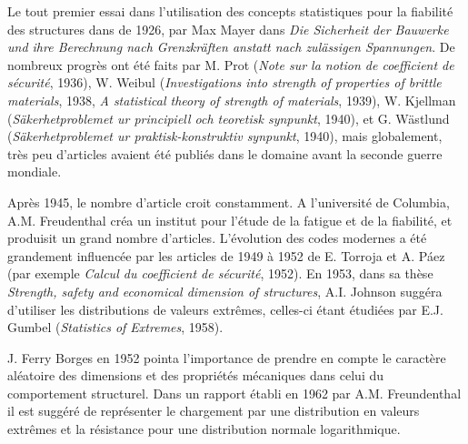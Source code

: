 \begin{histoire}
Le tout premier essai dans l'utilisation des concepts statistiques pour la fiabilité des structures dans de 1926, par Max Mayer dans \emph{Die Sicherheit der Bauwerke und ihre Berechnung nach Grenzkräften anstatt nach zulässigen Spannungen}. De nombreux progrès ont été faits par M. Prot (\emph{Note sur la notion de coefficient de sécurité}, 1936), W. Weibul (\emph{Investigations into strength of properties of brittle materials}, 1938, \emph{A statistical theory of strength of materials}, 1939), W. Kjellman (\emph{Säkerhetproblemet ur principiell och teoretisk synpunkt}, 1940), et G. Wästlund (\emph{Säkerhetproblemet ur praktisk-konstruktiv synpunkt}, 1940), mais globalement, très peu d'articles avaient été publiés dans le domaine avant la seconde guerre mondiale.

Après 1945, le nombre d'article croit constamment. A l'université de Columbia, A.M. Freudenthal créa un institut pour l'étude de la fatigue et de la fiabilité, et produisit un grand nombre d'articles. L'évolution des codes modernes a été grandement influencée par les articles de 1949 à 1952 de E. Torroja et A. P\'aez (par exemple \emph{Calcul du coefficient de sécurité}, 1952).
En 1953, dans sa thèse \emph{Strength, safety and economical dimension of structures}, A.I. Johnson  suggéra d'utiliser les distributions de valeurs extrêmes, celles-ci étant étudiées par E.J. Gumbel (\emph{Statistics of Extremes}, 1958).

J. Ferry Borges en 1952 pointa l'importance de prendre en compte le caractère aléatoire des dimensions et des propriétés mécaniques dans celui du comportement structurel. Dans un rapport établi en 1962 par A.M. Freundenthal il est suggéré de représenter le chargement par une distribution en valeurs extrêmes et la résistance pour une distribution normale logarithmique.


\end{histoire}
